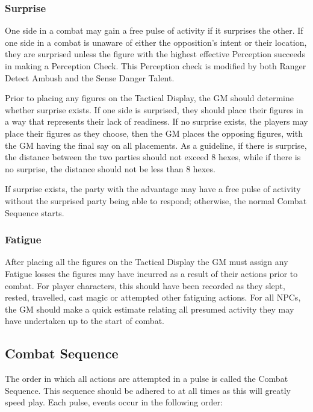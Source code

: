 \begin{multicols*}{3}
\subsubsection{Surprise}

One side in a combat may gain a free pulse of activity if it surprises
the other. If one side in a combat is unaware of either the
opposition's intent or their location, they are surprised unless the
figure with the highest effective Perception succeeds in making a
Perception Check. This Perception check is modified by both Ranger
Detect Ambush and the Sense Danger Talent.

Prior to placing any figures on the Tactical Display, the GM should
determine whether surprise exists. If one side is surprised, they
should place their figures in a way that represents their lack of
readiness. If no surprise exists, the players may place their figures
as they choose, then the GM places the opposing figures, with the GM
having the final say on all placements. As a guideline, if there is
surprise, the distance between the two parties should not exceed 8
hexes, while if there is no surprise, the distance should not be less
than 8 hexes.

If surprise exists, the party with the advantage may have a free pulse
of activity without the surprised party being able to respond;
otherwise, the normal Combat Sequence starts.

\subsubsection{Fatigue}

After placing all the figures on the Tactical Display the GM must
assign any Fatigue losses the figures may have incurred as a result of
their actions prior to combat. For player characters, this should have
been recorded as they slept, rested, travelled, cast magic or
attempted other fatiguing actions. For all NPCs, the GM should make a
quick estimate relating all presumed activity they may have undertaken
up to the start of combat.

\subsection{Combat Sequence}

The order in which all actions are attempted in a pulse is called the
Combat Sequence. This sequence should be adhered to at all times as
this will greatly speed play. Each pulse, events occur in the
following order:


\end{multicols*}

